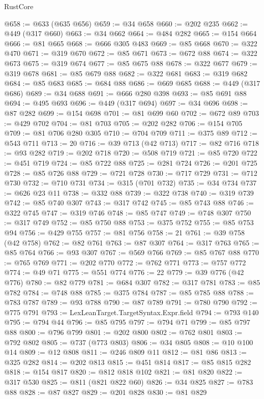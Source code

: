 \begin{lexlean}{RustCore}
\begin{coremodule}
@658 := @633 (@635 @656)
@659 := @34 @658
@660 := @202 @235
@662 := @449 (@317 @660)
@663 := @34 @662
@664 := @484 @282
@665 := @154 @664
@666 := @81 @665
@668 := @666 @305 @483
@669 := @85 @668
@670 := @322 @470
@671 := @319 @670
@672 := @85 @671
@673 := @672 @88
@674 := @322 @673
@675 := @319 @674
@677 := @85 @675 @88
@678 := @322 @677
@679 := @319 @678
@681 := @85 @679 @88
@682 := @322 @681
@683 := @319 @682
@684 := @85 @683
@685 := @684 @88
@686 := @669 @685
@688 := @449 (@317 @686)
@689 := @34 @688
@691 := @666 @280 @398
@693 := @85 @691 @88
@694 := @495 @693
@696 := @449 (@317 @694)
@697 := @34 @696
@698 := @87 @282
@699 := @154 @698
@701 := @81 @699 @60
@702 := @672 @89
@703 := @429 @702
@704 := @81 @703
@705 := @202 @282
@706 := @154 @705
@709 := @81 @706 @280 @305
@710 := @704 @709
@711 := @375 @89
@712 := @543 @711
@713 := 20
@716 := @39 @713 (@42 @713)
@717 := @82 @716
@718 := @93 @282
@719 := @202 @718
@720 := @508 @719
@721 := @85 @720
@722 := @451 @719
@724 := @85 @722 @88
@725 := @281 @724
@726 := @201 @725
@728 := @85 @726 @88
@729 := @721 @728
@730 := @717 @729
@731 := @712 @730
@732 := @710 @731
@734 := @315 (@701 @732)
@735 := @34 @734
@737 := @626 @23 @11
@738 := @332 @88
@739 := @322 @738
@740 := @319 @739
@742 := @85 @740 @307
@743 := @317 @742
@745 := @85 @743 @88
@746 := @322 @745
@747 := @319 @746
@748 := @85 @747
@749 := @748 @307
@750 := @317 @749
@752 := @85 @750 @88
@753 := @375 @752
@755 := @85 @753 @94
@756 := @429 @755
@757 := @81 @756
@758 := 21
@761 := @39 @758 (@42 @758)
@762 := @82 @761
@763 := @87 @307
@764 := @317 @763
@765 := @85 @764
@766 := @93 @307
@767 := @569 @766
@769 := @85 @767 @88
@770 := @765 @769
@771 := @202 @770
@772 := @762 @771
@773 := @757 @772
@774 := @49 @71
@775 := @551 @774
@776 := 22
@779 := @39 @776 (@42 @776)
@780 := @82 @779
@781 := @684 @307
@782 := @317 @781
@783 := @85 @782
@784 := @748 @88
@785 := @375 @784
@787 := @85 @785 @88
@788 := @783 @787
@789 := @93 @788
@790 := @87 @789
@791 := @780 @790
@792 := @775 @791
@793 := LexLeanTarget.TargetSyntax.Expr.field
@794 := @793 @140
@795 := @794 @44
@796 := @85 @795
@797 := @794 @71
@799 := @85 @797 @88
@800 := @796 @799
@801 := @202 @800
@802 := @762 @801
@803 := @792 @802
@805 := @737 (@773 @803)
@806 := @34 @805
@808 := @10 @100 @14
@809 := @12 @808
@811 := @246 @809 @11
@812 := @81 @86
@813 := @325 @282
@814 := @202 @813
@815 := @451 @814
@817 := @85 @815 @282
@818 := @154 @817
@820 := @812 @818 @102
@821 := @81 @820
@822 := @317 @530
@825 := @811 (@821 @822 @60)
@826 := @34 @825
@827 := @783 @88
@828 := @87 @827
@829 := @201 @828
@830 := @81 @829

\end{coremodule}
\end{lexlean}
